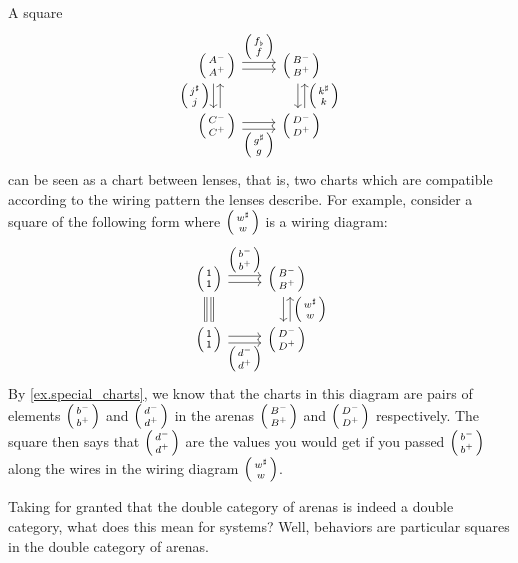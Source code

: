 \documentclass[DynamicalBook]{subfiles}
\begin{document}
\begin{example}\label{ex.understanding_squares_in_double_cat_of_arenas}
  A square
  \begin{equation}\label{eqn.understanding_squares_in_double_cat_of_arenas}
    \begin{tikzcd}
      \lens{A^-}{A^+} \ar[r, shift left, "\lens{f_{\flat}}{f}"] \ar[r, shift
      right] \ar[d, shift right, "\lens{j^{\sharp}}{j}"'] \ar[d, shift left,
      leftarrow] & \lens{B^-}{B^+} \ar[d, shift left, leftarrow,
      "\lens{k^{\sharp}}{k}"] \ar[d, shift right]\\
      \lens{C^-}{C^+} \ar[r, shift right, "\lens{g^{\sharp}}{g}"'] \ar[r, shift
      left] & \lens{D^-}{D^+}
    \end{tikzcd}
    \end{equation}
  can be seen as a chart between lenses, that is, two charts which are
  compatible according to the wiring pattern the lenses describe. For example, consider a square of the
  following form where $\lens{w^{\sharp}}{w}$ is a wiring diagram:
  \[
    \begin{tikzcd}
      \lens{\ord{1}}{\ord{1}} \ar[r, shift left, "\lens{b^-}{b^+}"] \ar[r, shift
      right] \ar[d, shift right, equals] \ar[d, shift left, equals] &
      \lens{B^-}{B^+} \ar[d, shift left, leftarrow,
      "\lens{w^{\sharp}}{w}"] \ar[d, shift right]\\
      \lens{\ord{1}}{\ord{1}} \ar[r, shift right, "\lens{d^-}{d^+}"'] \ar[r,
      shift left] & \lens{D^-}{D^+}
    \end{tikzcd}
  \]
  By \cref{ex.special_charts}, we know that the charts in this diagram are pairs
  of elements $\lens{b^-}{b^+}$ and $\lens{d^-}{d^+}$ in the arenas
  $\lens{B^-}{B^+}$ and $\lens{D^-}{D^+}$ respectively. The square then says
  that $\lens{d^-}{d^+}$ are the values you would get if you passed
  $\lens{b^-}{b^+}$ along the wires in the wiring diagram
  $\lens{w^{\sharp}}{w}$.
\end{example}

Taking for granted that the double category of arenas is indeed a double
category, what does this mean for systems? Well, behaviors are particular
squares in the double category of arenas.
\end{document}
